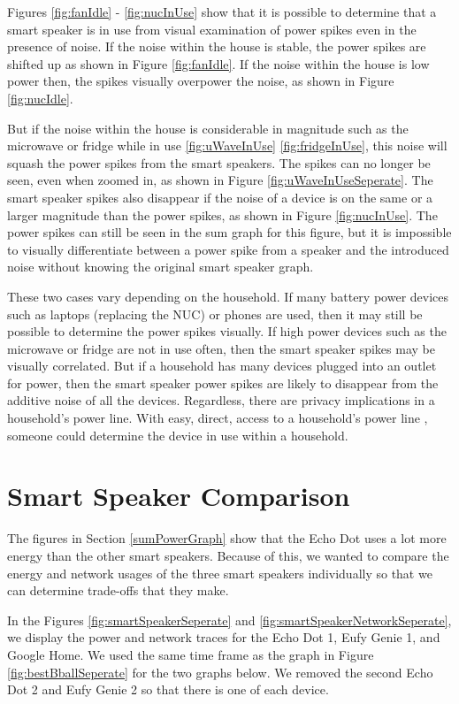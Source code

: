 Figures \ref{fig:fanIdle} - \ref{fig:nucInUse} show that it is possible to determine that a smart speaker is in use from visual examination of power spikes even in the presence of noise. If the noise within the house is stable, the power spikes are shifted up as shown in Figure \ref{fig:fanIdle}. If the noise within the house is low power then, the spikes visually overpower the noise, as shown in Figure \ref{fig:nucIdle}.

But if the noise within the house is considerable in magnitude such as the microwave or fridge while in use \ref{fig:uWaveInUse} \ref{fig:fridgeInUse}, this noise will squash the power spikes from the smart speakers. The spikes can no longer be seen, even when zoomed in, as shown in Figure \ref{fig:uWaveInUseSeperate}. The smart speaker spikes also disappear if the noise of a device is on the same or a larger magnitude than the power spikes, as shown in Figure \ref{fig:nucInUse}. The power spikes can still be seen in the sum graph for this figure, but it is impossible to visually differentiate between a power spike from a speaker and the introduced noise without knowing the original smart speaker graph.

These two cases vary depending on the household. If many battery power devices such as laptops (replacing the NUC) or phones are used, then it may still be possible to determine the power spikes visually. If high power devices such as the microwave or fridge are not in use often, then the smart speaker spikes may be visually correlated. But if a household has many devices plugged into an outlet for power, then the smart speaker power spikes are likely to disappear from the additive noise of all the devices. Regardless, there are privacy implications in a household's power line. With easy, direct, access to a household's power line \cite{griffith_2017}, someone could determine the device in use within a household.

\section{Smart Speaker Comparison}
\label{smartSpeakerComparisonSection}
The figures in Section \ref{sumPowerGraph} show that the Echo Dot uses a lot more energy than the other smart speakers. Because of this, we wanted to compare the energy and network usages of the three smart speakers individually so that we can determine trade-offs that they make.

In the Figures \ref{fig:smartSpeakerSeperate} and \ref{fig:smartSpeakerNetworkSeperate}, we display the power and network traces for the Echo Dot 1, Eufy Genie 1, and Google Home. We used the same time frame as the graph in Figure \ref{fig:bestBballSeperate} for the two graphs below. We removed the second Echo Dot 2 and Eufy Genie 2 so that there is one of each device.

